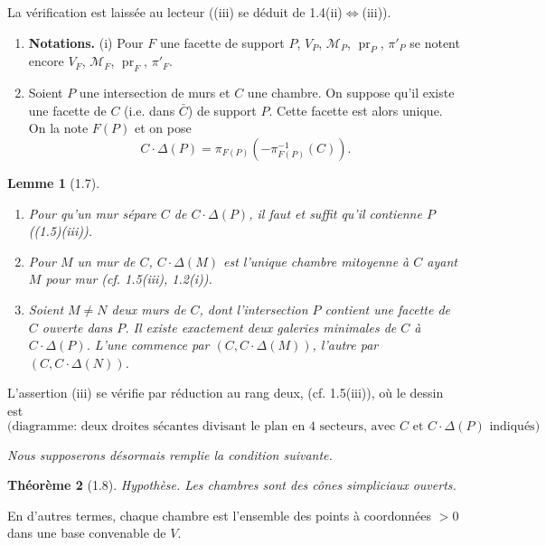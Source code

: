 \documentclass[12pt]{article}
\newtheorem{theoreme}{Théorème}
\newtheorem{lemme}[theoreme]{Lemme}
\theoremstyle{remark}
\begin{document}
La vérification est laissée au lecteur ((iii) se déduit de 1.4(ii)$\Leftrightarrow$(iii)).

\begin{enumerate}
\item[(1.6)] \textbf{Notations.} (i) Pour $F$ une facette de support $P$, $V_P$, $\mathcal{M}_P$, $\operatorname{pr}_P$, $\pi'_P$ se notent encore $V_F$, $\mathcal{M}_F$, $\operatorname{pr}_F$, $\pi'_F$.

\item[(ii)] Soient $P$ une intersection de murs et $C$ une chambre. On suppose qu'il existe une facette de $C$ (i.e. dans $\bar{C}$) de support $P$. Cette facette est alors unique. On la note $F(P)$ et on pose
\[C \cdot \Delta(P) = \pi_{F(P)}(-\pi_{F(P)}^{-1}(C)).\]
\end{enumerate}

\begin{lemme}[1.7]
\begin{enumerate}
\item[(i)] Pour qu'un mur sépare $C$ de $C \cdot \Delta(P)$, il faut et suffit qu'il contienne $P$ ((1.5)(iii)).
\item[(ii)] Pour $M$ un mur de $C$, $C \cdot \Delta(M)$ est l'unique chambre mitoyenne à $C$ ayant $M$ pour mur (cf. 1.5(iii), 1.2(i)).
\item[(iii)] Soient $M \neq N$ deux murs de $C$, dont l'intersection $P$ contient une facette de $C$ ouverte dans $P$. Il existe exactement deux galeries minimales de $C$ à $C \cdot \Delta(P)$. L'une commence par $(C, C \cdot \Delta(M))$, l'autre par $(C, C \cdot \Delta(N))$.
\end{enumerate}
\end{lemme}

L'assertion (iii) se vérifie par réduction au rang deux, (cf. 1.5(iii)), où le dessin est
\begin{equation}
\text{(diagramme: deux droites sécantes divisant le plan en 4 secteurs, avec $C$ et $C \cdot \Delta(P)$ indiqués)}\tag{1.7.1}
\end{equation}

\emph{Nous supposerons désormais remplie la condition suivante.}

\begin{theoreme}[1.8]\textit{Hypothèse.}
Les chambres sont des cônes simpliciaux ouverts.
\end{theoreme}

En d'autres termes, chaque chambre est l'ensemble des points à coordonnées $> 0$ dans une base convenable de $V$.
\end{document}
